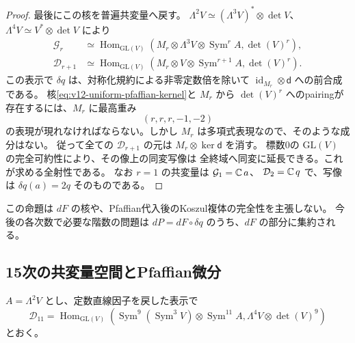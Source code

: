 \begin{proof}
最後にこの核を普遍共変量へ戻す。
$\Lambda^2V\simeq(\Lambda^3V)^*\otimes\det V$、
$\Lambda^4V\simeq V^*\otimes\det V$ により
\begin{align*}
 \mathcal G_r&\simeq\operatorname{Hom}_{\mathrm{GL}(V)}
 \left(M_r\otimes\Lambda^3V\otimes\operatorname{Sym}^rA,
       \det(V)^r\right),\\
 \mathcal D_{r+1}&\simeq\operatorname{Hom}_{\mathrm{GL}(V)}
 \left(M_r\otimes V\otimes\operatorname{Sym}^{r+1}A,
       \det(V)^r\right).
\end{align*}
この表示で $\delta q$ は、対称化規約による非零定数倍を除いて
$\operatorname{id}_{M_r}\otimes\mathsf d$ への前合成である。
核\eqref{eq:v12-uniform-pfaffian-kernel}と $M_r$ から
$\det(V)^r$ へのpairingが存在するには、$M_r$ に最高重み
\[
 (r,r,r,-1,-2)
\]
の表現が現れなければならない。しかし $M_r$ は多項式表現なので、そのような成分はない。
従って全ての $\mathcal D_{r+1}$ の元は $M_r\otimes\ker\mathsf d$ を消す。
標数0の $\mathrm{GL}(V)$ の完全可約性により、その像上の同変写像は
全終域へ同変に延長できる。これが求める全射性である。
なお $r=1$ の共変量は $\mathcal G_1=\mathbb C\,a$、
$\mathcal D_2=\mathbb C\,q$ で、写像は $\delta q(a)=2q$ そのものである。
\end{proof}

この命題は $dF$ の核や、Pfaffian代入後のKoszul複体の完全性を主張しない。
今後の各次数で必要な階数の問題は
$dP=dF\circ\delta q$ のうち、$dF$ の部分に集約される。

\subsection{15次の共変量空間とPfaffian微分}
\label{subsec:v12-fifteenth-characters}

$A=\Lambda^2V$ とし、定数直線因子を戻した表示で
\[
 \mathcal D_{11}=\operatorname{Hom}_{\mathrm{GL}(V)}
 \left(\operatorname{Sym}^{9}(\operatorname{Sym}^3V)
       \otimes\operatorname{Sym}^{11}A,
       \Lambda^4V\otimes\det(V)^9\right)
\]
とおく。

